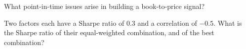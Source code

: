 \begin{interviewq}\label{iq:s1:value-quality-and-low-risk:5}
What point-in-time issues arise in building a book-to-price signal?
\end{interviewq}

\begin{interviewq}\label{iq:s1:value-quality-and-low-risk:6}
Two factors each have a Sharpe ratio of 0.3 and a correlation of $-0.5$. What is the Sharpe ratio of their equal-weighted combination, and of the best
combination?
\end{interviewq}
